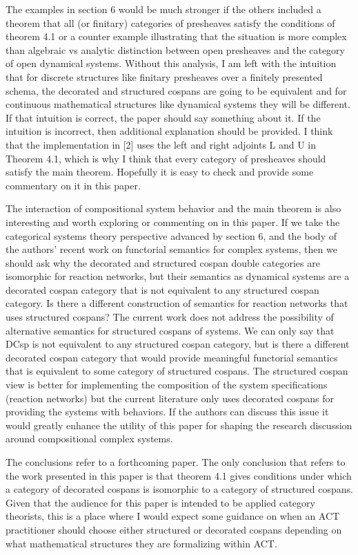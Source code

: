 \documentclass[reqno]{amsart}
\begin{document}
{The examples in section 6 would be much stronger if the others included a theorem that all (or finitary) categories of presheaves satisfy the 
conditions of theorem 4.1 or a counter example illustrating that the situation is more complex than algebraic vs analytic distinction between open 
presheaves and the category of open dynamical systems. Without this analysis, I am left with the intuition that for discrete structures like finitary 
presheaves over a finitely presented schema, the decorated and structured cospans are going to be equivalent and for continuous mathematical 
structures like dynamical systems they will be different. If that intuition is correct, the paper should say something about it. If the intuition is 
incorrect, then additional explanation should be provided. I think that the implementation in [2] uses the left and right adjoints L and U in Theorem 
4.1, which is why I think that every category of presheaves should satisfy the main theorem. Hopefully it is easy to check and provide some commentary 
on it in this paper.

The interaction of compositional system behavior and the main theorem is also interesting and worth exploring or commenting on in this paper. If we 
take the categorical systems theory perspective advanced by section 6, and the body of the authors’ recent work on functorial semantics for complex 
systems, then we should ask why the decorated and structured cospan double categories are isomorphic for reaction networks, but their semantics as 
dynamical systems are a decorated cospan category that is not equivalent to any structured cospan category. Is there a different construction of 
semantics for reaction networks that uses structured cospans? The current work does not address the possibility of alternative semantics for 
structured cospans of systems. We can only say that DCsp is not equivalent to any structured cospan category, but is there a different decorated 
cospan category that would provide meaningful functorial semantics that is equivalent to some category of structured cospans. The structured cospan 
view is better for implementing the composition of the system specifications (reaction networks) but the current literature only uses decorated 
cospans for providing the systems with behaviors. If the authors can discuss this issue it would greatly enhance the utility of this paper for shaping 
the research discussion around compositional complex systems.

The conclusions refer to a forthcoming paper. The only conclusion that refers to the work presented in this paper is that theorem 4.1 gives conditions 
under which a category of decorated cospans is isomorphic to a category of structured cospans. Given that the audience for this paper is intended to 
be applied category theorists, this is a place where I would expect some guidance on when an ACT practitioner should choose either structured or 
decorated cospans depending on what mathematical structures they are formalizing within ACT.

}
\end{document}
